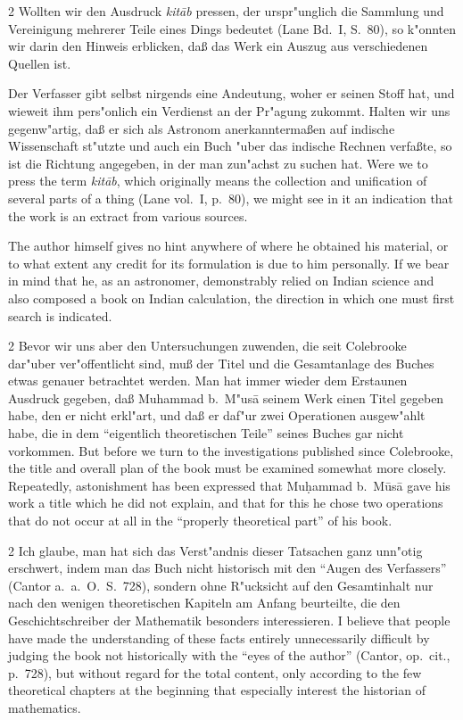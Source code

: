 \documentclass[10pt,a4paper]{article}
\renewcommand{\switchcolumn}{\syncronize\nointerlineskip\columnbreak}
\newcommand{\enquote}[1]{``#1''}
\begin{document}
\begin{paracol}{2}
Wollten wir den Ausdruck \textit{kit\=ab} pressen, der urspr"unglich die Sammlung und Vereinigung mehrerer Teile eines Dings bedeutet (Lane Bd.\ I, S.\ 80), so k"onnten wir darin den Hinweis erblicken, da\ss{} das Werk ein Auszug aus verschiedenen Quellen ist.

Der Verfasser gibt selbst nirgends eine Andeutung, woher er seinen Stoff hat, und wieweit ihm pers"onlich ein Verdienst an der Pr"agung zukommt. Halten wir uns gegenw"artig, da\ss{} er sich als Astronom anerkannterma\ss{}en auf indische Wissenschaft st"utzte und auch ein Buch "uber das indische Rechnen verfa\ss{}te, so ist die Richtung angegeben, in der man zun"achst zu suchen hat.
\switchcolumn
Were we to press the term \textit{kit\=ab}, which originally means the collection and unification of several parts of a thing (Lane vol.\ I, p.\ 80), we might see in it an indication that the work is an extract from various sources.

The author himself gives no hint anywhere of where he obtained his material, or to what extent any credit for its formulation is due to him personally. If we bear in mind that he, as an astronomer, demonstrably relied on Indian science and also composed a book on Indian calculation, the direction in which one must first search is indicated.
\end{paracol}

\begin{paracol}{2}
Bevor wir uns aber den Untersuchungen zuwenden, die seit Colebrooke dar"uber ver"offentlicht sind, mu\ss{} der Titel und die Gesamtanlage des Buches etwas genauer betrachtet werden. Man hat immer wieder dem Erstaunen Ausdruck gegeben, da\ss{} Muhammad b.\ M"us\=a seinem Werk einen Titel gegeben habe, den er nicht erkl"art, und da\ss{} er daf"ur zwei Operationen ausgew"ahlt habe, die in dem \enquote{eigentlich theoretischen Teile} seines Buches gar nicht vorkommen.
\switchcolumn
But before we turn to the investigations published since Colebrooke, the title and overall plan of the book must be examined somewhat more closely. Repeatedly, astonishment has been expressed that Mu\d{h}ammad b.\ M\=us\=a gave his work a title which he did not explain, and that for this he chose two operations that do not occur at all in the ``properly theoretical part'' of his book.
\end{paracol}

\begin{paracol}{2}
Ich glaube, man hat sich das Verst"andnis dieser Tatsachen ganz unn"otig erschwert, indem man das Buch nicht historisch mit den \enquote{Augen des Verfassers} (Cantor a.\ a.\ O.\ S.\ 728), sondern ohne R"ucksicht auf den Gesamtinhalt nur nach den wenigen theoretischen Kapiteln am Anfang beurteilte, die den Geschichtschreiber der Mathematik besonders interessieren.
\switchcolumn
I believe that people have made the understanding of these facts entirely unnecessarily difficult by judging the book not historically with the ``eyes of the author'' (Cantor, op.\ cit., p.\ 728), but without regard for the total content, only according to the few theoretical chapters at the beginning that especially interest the historian of mathematics.
\end{paracol}
\end{document}
